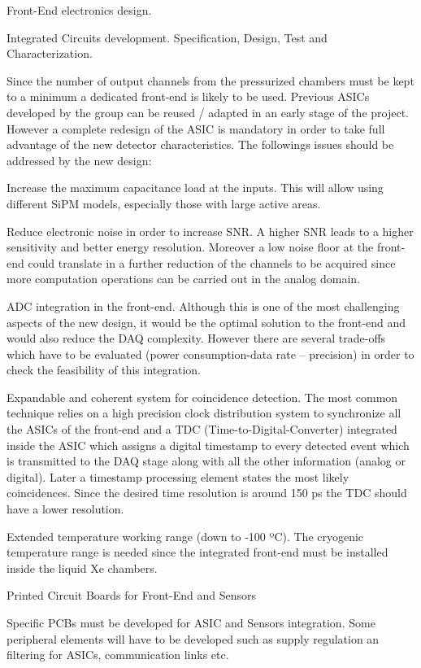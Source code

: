 Front-End electronics design.

Integrated Circuits development. Specification, Design, Test and Characterization.

Since the number of output channels from the pressurized chambers must be kept to a minimum a dedicated front-end is likely to be used. Previous ASICs developed by the group can be reused / adapted in an early stage of the project. However a complete redesign of the ASIC is mandatory in order to take full advantage of the new detector characteristics. The followings issues should be addressed by the new design:


Increase the maximum capacitance load at the inputs. This will allow using different SiPM models, especially those with large active areas.


Reduce electronic noise in order to increase SNR. A higher SNR leads to a higher sensitivity and better energy resolution. Moreover a low noise floor at the front-end could translate in a further reduction of the channels to be acquired since more computation operations can be carried out in the analog domain.


ADC integration in the front-end. Although this is one of the most challenging aspects of the new design, it would be the optimal solution to the front-end and would also reduce the DAQ complexity. However there are several trade-offs which have to be evaluated (power consumption-data rate – precision) in order to check the feasibility of this integration.


Expandable and coherent system for coincidence detection. The most common technique relies on a high precision clock distribution system to synchronize all the ASICs of the front-end and a TDC (Time-to-Digital-Converter) integrated inside the ASIC which assigns a digital timestamp to every detected event which is transmitted to the DAQ stage along with all the other information (analog or digital). Later a timestamp processing element states the most likely coincidences. Since the desired time resolution is around 150 ps the TDC should have a lower resolution.


Extended temperature working range (down to -100 ºC). The cryogenic temperature range is needed since the integrated front-end must be installed inside the liquid Xe chambers.


Printed Circuit Boards for Front-End and Sensors

Specific PCBs must be developed for ASIC and Sensors integration. Some peripheral elements will have to be developed such as supply regulation an filtering for ASICs, communication links etc.


